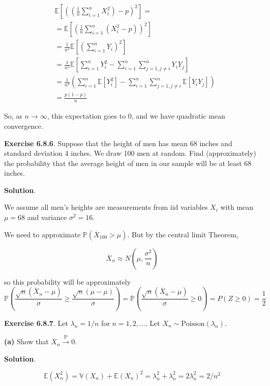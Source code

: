 \begin{align*}
& \mathbb{E}\left[\left(\left(\frac{1}{n} \sum_{i=1}^{n} X_{i}^{2}\right) - p\right)^{2}\right] = \\
& = \mathbb{E}\left[\left(\frac{1}{n} \sum_{i=1}^{n} \left(X_{i}^{2} - p\right)\right)^{2}\right] \\
& = \frac{1}{n^{2}} \mathbb{E}\left[\left(\sum_{i=1}^{n} Y_{i}\right)^{2}\right] \\
& = \frac{1}{n^{2}} \mathbb{E}\left[\sum_{i=1}^{n} Y_{i}^{2} - \sum_{i=1}^{n} \sum_{j=1, j \neq i}^{n} Y_{i} Y_{j}\right] \\
& = \frac{1}{n^{2}} \left( \sum_{i=1}^{n} \mathbb{E}\left[Y_{i}^{2}\right] - \sum_{i=1}^{n} \sum_{j=1, j \neq i}^{n} \mathbb{E}\left[ Y_{i} Y_{j} \right] \right) \\
& = \frac{p(1-p)}{n}
\end{align*}

So, as \(n \rightarrow \infty\), this expectation goes to 0, and we have
quadratic mean convergence.

\textbf{Exercise 6.8.6}. Suppose that the height of men has mean 68
inches and standard deviation 4 inches. We draw 100 men at random. Find
(approximately) the probability that the average height of men in our
sample will be at least 68 inches.

\textbf{Solution}.

We assume all men's heights are measurements from iid variables \(X_{i}\)
with mean \(\mu = 68\) and variance \(\sigma^{2} = 16\).

We need to approximate \(\mathbb{P}(\overline{X}_{100} > \mu)\). But by
the central limit Theorem,

\[ \overline{X}_{n} \approx N\left(\mu, \frac{\sigma^{2}}{n}\right) \]

so this probability will be approximately
\[\mathbb{P}\left(\frac{\sqrt{n}(\overline{X}_{n} - \mu)}{\sigma} \geq \frac{\sqrt{n}(\mu- \mu)}{\sigma}\right) = \mathbb{P}\left(\frac{\sqrt{n}(\overline{X}_{n} - \mu)}{\sigma} \geq 0 \right) = P(Z \geq 0) = \frac{1}{2}\]

\textbf{Exercise 6.8.7}. Let \(\lambda_{n} = 1/n\) for
\(n = 1, 2, \dots\). Let \(X_{n} \sim \text{Poisson}(\lambda_{n})\).

\textbf{(a)} Show that \(X_{n} \xrightarrow{\text{P}} 0\).

\textbf{Solution}.

\[
\mathbb{E}(X_{n}^{2}) = \mathbb{V}(X_{n}) + \mathbb{E}(X_{n})^{2}
= \lambda_{n}^{2} + \lambda_{n}^{2} = 2 \lambda_{n}^{2} = 2/n^{2}
\]

